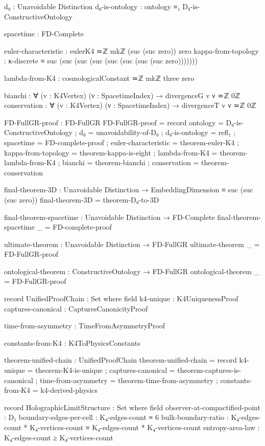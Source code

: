 \documentclass[11pt,a4paper]{book}
\begin{document}
\begin{code}
    d₀                : Unavoidable Distinction
    d₀-is-ontology    : ontology ≡₁ D₀-is-ConstructiveOntology
    
    spacetime         : FD-Complete
    
    euler-characteristic : eulerK4 ≃ℤ mkℤ (suc (suc zero)) zero
    kappa-from-topology  : κ-discrete ≡ suc (suc (suc (suc (suc (suc (suc (suc zero)))))))
    
    lambda-from-K4    : cosmologicalConstant ≃ℤ mkℤ three zero
    
    bianchi           : ∀ (v : K4Vertex) (ν : SpacetimeIndex) → divergenceG v ν ≃ℤ 0ℤ
    conservation      : ∀ (v : K4Vertex) (ν : SpacetimeIndex) → divergenceT v ν ≃ℤ 0ℤ

FD-FullGR-proof : FD-FullGR
FD-FullGR-proof = record
  { ontology            = D₀-is-ConstructiveOntology
  ; d₀                  = unavoidability-of-D₀
  ; d₀-is-ontology      = refl₁
  ; spacetime           = FD-complete-proof
  ; euler-characteristic = theorem-euler-K4
  ; kappa-from-topology = theorem-kappa-is-eight
  ; lambda-from-K4      = theorem-lambda-from-K4
  ; bianchi             = theorem-bianchi
  ; conservation        = theorem-conservation
  }

final-theorem-3D : Unavoidable Distinction → EmbeddingDimension ≡ suc (suc (suc zero))
final-theorem-3D = theorem-D₀-to-3D

final-theorem-spacetime : Unavoidable Distinction → FD-Complete
final-theorem-spacetime _ = FD-complete-proof

ultimate-theorem : Unavoidable Distinction → FD-FullGR
ultimate-theorem _ = FD-FullGR-proof

ontological-theorem : ConstructiveOntology → FD-FullGR
ontological-theorem _ = FD-FullGR-proof

record UnifiedProofChain : Set where
  field
    k4-unique           : K4UniquenessProof
    captures-canonical  : CapturesCanonicityProof
    
    time-from-asymmetry : TimeFromAsymmetryProof
    
    constants-from-K4   : K4ToPhysicsConstants

theorem-unified-chain : UnifiedProofChain
theorem-unified-chain = record
  { k4-unique          = theorem-K4-is-unique
  ; captures-canonical = theorem-captures-is-canonical
  ; time-from-asymmetry = theorem-time-from-asymmetry
  ; constants-from-K4  = k4-derived-physics
  }

record HolographicLimitStructure : Set where
  field
    observer-at-compactified-point : D₁
    boundary-edges-per-cell : K₄-edges-count ≡ 6
    bulk-boundary-ratio : K₄-edges-count * K₄-vertices-count ≡ K₄-edges-count * K₄-vertices-count
    entropy-area-law : K₄-edges-count ≥ K₄-vertices-count


\end{code}
\end{document}
